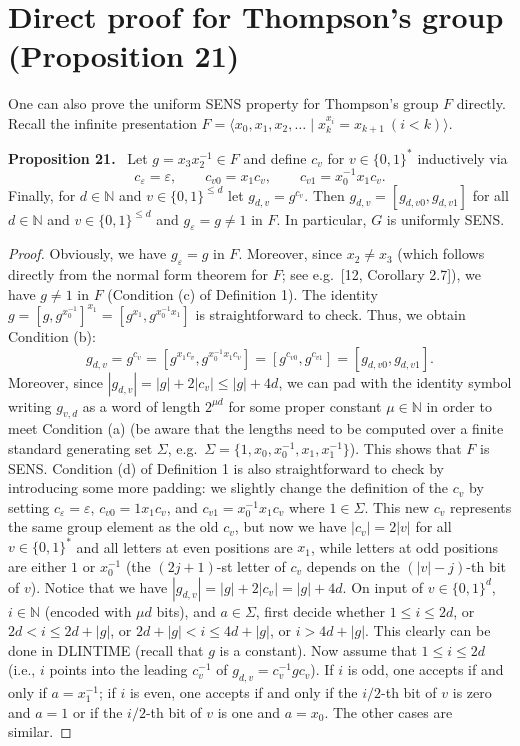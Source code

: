\documentclass[10pt,a4paper]{article}
\newenvironment{authorclaim}[1]{\par\medskip\noindent\textbf{#1.}\ \ignorespaces}{\par\medskip}
\begin{document}
\section*{Direct proof for Thompson's group (Proposition 21)}
One can also prove the uniform SENS property for Thompson's group $F$ directly. Recall the infinite presentation $F=\langle x_0,x_1,x_2,\ldots\mid x_k^{x_i}=x_{k+1}\ (i<k)\rangle$.
\begin{authorclaim}{Proposition 21}
Let $g=x_3x_2^{-1}\in F$ and define $c_v$ for $v\in\{0,1\}^*$ inductively via
\[
c_\varepsilon=\varepsilon,\qquad c_{v0}=x_1c_v,\qquad c_{v1}=x_0^{-1}x_1c_v.
\]
Finally, for $d\in\mathbb N$ and $v\in\{0,1\}^{\le d}$ let $g_{d,v}=g^{c_v}$. Then $g_{d,v}=[g_{d,v0},g_{d,v1}]$ for all $d\in\mathbb N$ and $v\in\{0,1\}^{\le d}$ and $g_\varepsilon=g\ne1$ in $F$. In particular, $G$ is uniformly SENS.
\end{authorclaim}
\begin{proof}
Obviously, we have $g_\varepsilon=g$ in $F$. Moreover, since $x_2\ne x_3$ (which follows directly from the normal form theorem for $F$; see e.g.\ [12, Corollary 2.7]), we have $g\ne1$ in $F$ (Condition (c) of Definition 1). The identity $g=[g,g^{x_0^{-1}}]^{x_1}=[g^{x_1},g^{x_0^{-1}x_1}]$ is straightforward to check. Thus, we obtain Condition (b):
\[
g_{d,v}=g^{c_v}=[g^{x_1c_v},g^{x_0^{-1}x_1c_v}]
=[g^{c_{v0}},g^{c_{v1}}]=[g_{d,v0},g_{d,v1}].
\]
Moreover, since $|g_{d,v}|=|g|+2|c_v|\le|g|+4d$, we can pad with the identity symbol writing $g_{v,d}$ as a word of length $2^{\mu d}$ for some proper constant $\mu\in\mathbb N$ in order to meet Condition (a) (be aware that the lengths need to be computed over a finite standard generating set $\Sigma$, e.g.\ $\Sigma=\{1,x_0,x_0^{-1},x_1,x_1^{-1}\}$). This shows that $F$ is SENS.
Condition (d) of Definition 1 is also straightforward to check by introducing some more padding: we slightly change the definition of the $c_v$ by setting $c_\varepsilon=\varepsilon$, $c_{v0}=1x_1c_v$, and $c_{v1}=x_0^{-1}x_1c_v$ where $1\in\Sigma$. This new $c_v$ represents the same group element as the old $c_v$, but now we have $|c_v|=2|v|$ for all $v\in\{0,1\}^*$ and all letters at even positions are $x_1$, while letters at odd positions are either $1$ or $x_0^{-1}$ (the $(2j+1)$-st letter of $c_v$ depends on the $(|v|-j)$-th bit of $v$). Notice that we have $|g_{d,v}|=|g|+2|c_v|=|g|+4d$.
On input of $v\in\{0,1\}^d$, $i\in\mathbb N$ (encoded with $\mu d$ bits), and $a\in\Sigma$, first decide whether $1\le i\le2d$, or $2d<i\le2d+|g|$, or $2d+|g|<i\le4d+|g|$, or $i>4d+|g|$. This clearly can be done in DLINTIME (recall that $g$ is a constant). Now assume that $1\le i\le2d$ (i.e., $i$ points into the leading $c_v^{-1}$ of $g_{d,v}=c_v^{-1}gc_v$). If $i$ is odd, one accepts if and only if $a=x_1^{-1}$; if $i$ is even, one accepts if and only if the $i/2$-th bit of $v$ is zero and $a=1$ or if the $i/2$-th bit of $v$ is one and $a=x_0$. The other cases are similar.
\end{proof}
\end{document}
